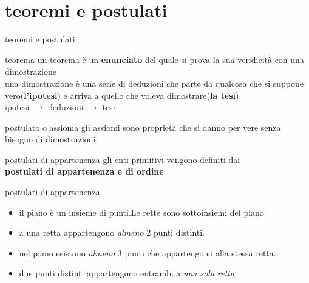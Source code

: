 \documentclass{beamer}
\newif\ifplacelogo %
\begin{document}
\section{teoremi e postulati}
\begin{frame}{teoremi e postulati}
    \begin{block}{teorema}
    un teorema è un \textbf{enunciato} del quale si prova la sua veridicità con una dimostrazione \\
    una dimostrazione è una serie di deduzioni che parte da qualcosa che si suppone vero(\textbf{l'ipotesi}) e arriva a quello che voleva dimostrare(\textbf{la tesi}) \\
    ipotesi $\rightarrow$ deduzioni $\rightarrow$ tesi
    \end{block}
    \begin{block}{postulato o assioma}
    gli assiomi sono proprietà che si danno per vere senza bisogno di dimostrazioni 
    \end{block}
\end{frame}
\begin{frame}{postulati di appartenenza}
   gli enti primitivi vengono definiti dai \\ \textbf{postulati di appartenenza e di ordine}
\begin{block}{postulati di appartenenza}
\begin{itemize}
    \item il piano è un insieme di punti.Le rette sono sottoinsiemi del piano
    \item a una retta appartengono \emph{almeno} 2 punti distinti.
    \item nel piano esistono \emph{almeno} 3 punti che appartengono alla stessa retta.
    \item due punti distinti appartengono entrambi a \emph{una sola retta} 
\end{itemize}
\end{block}
\end{frame}
\placelogofalse %
\end{document}
